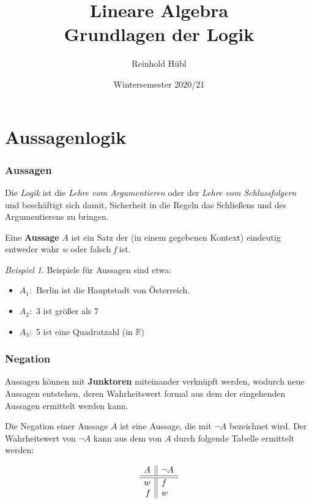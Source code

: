 \documentclass[hyperref={pdfpagelabels=false}]{beamer}
\title{Lineare Algebra \\ Grundlagen der Logik}
\author{ Reinhold Hübl}
\date{Wintersemester 2020/21}
\theoremstyle{plain}%
\theoremstyle{definition}
\theoremstyle{remark}
\newtheorem*{beispiel}{Beispiel}
\begin{document}
\begin{frame}
\titlepage
\centering 
 
\end{frame} 




\section{Aussagenlogik}

\begin{frame}
\frametitle{Aussagen}
Die \textit{Logik} ist die \textit{Lehre vom Argumentieren} oder der \textit{Lehre vom Schlussfolgern} und 
beschäftigt sich damit, Sicherheit in die Regeln das Schließens und des Argumentierens zu bringen.

\pause 

\begin{definition} Eine \textbf{Aussage} $A$ ist ein Satz der (in einem gegebenen Kontext) 
eindeutig entweder wahr \textit{w} oder falsch \textit{f} ist.
\end{definition}

\pause

\begin{beispiel}
Beispiele für Aussagen sind etwa:
\begin{itemize}
\item $A_1:$ Berlin ist die Hauptstadt von Österreich.
\item $A_2:$ 3 ist größer als 7
\item $A_3:$ 5 ist eine Quadratzahl (in $\mathbb R$)
\end{itemize}
\end{beispiel}


\end{frame}

\begin{frame}
\frametitle{Negation}

Aussagen können mit \textbf{Junktoren} miteinander verknüpft werden, wodurch neue Aussagen entstehen, deren 
Wahrheitswert formal aus dem der eingehenden Aussagen ermittelt werden kann.

\pause

Die Negation einer Aussage $A$ ist eine Aussage, die mit $\neg A$ bezeichnet wird. Der Wahrheitswert von $\neg A$ 
kann aus dem von $A$ durch folgende Tabelle ermittelt werden: 

\pause 

	$$ \begin{array}{ r | | l }
	A &  \neg A \\
	\hline \hline
	w &  f \\
	f &  w \\
	\end{array} $$

\end{frame}
\end{document}
